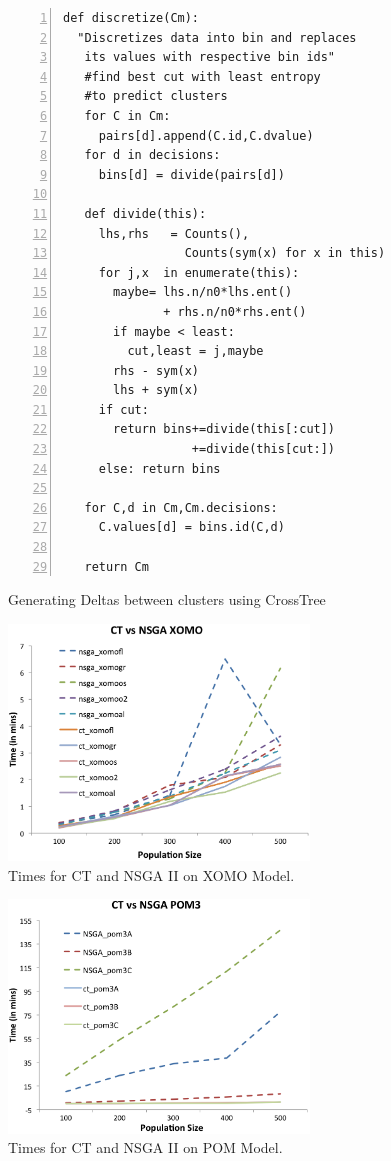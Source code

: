 \documentclass[11pt,twocolumn]{article}
\begin{document}
\begin{figure}[!b]
\begin{center}
\begin{lstlisting}[mathescape,frame=l,numbers=left]
def discretize(Cm):
  "Discretizes data into bin and replaces 
   its values with respective bin ids"
   #find best cut with least entropy 
   #to predict clusters
   for C in Cm:
     pairs[d].append(C.id,C.dvalue)
   for d in decisions:
     bins[d] = divide(pairs[d])

   def divide(this):
     lhs,rhs   = Counts(),
                 Counts(sym(x) for x in this)
     for j,x  in enumerate(this): 
       maybe= lhs.n/n0*lhs.ent()  
              + rhs.n/n0*rhs.ent()
       if maybe < least:
         cut,least = j,maybe
       rhs - sym(x)
       lhs + sym(x)
     if cut:
       return bins+=divide(this[:cut])
                  +=divide(this[cut:])
     else: return bins

   for C,d in Cm,Cm.decisions:
     C.values[d] = bins.id(C,d)

   return Cm
\end{lstlisting}
\end{center}
\caption{Generating Deltas between clusters using CrossTree}
\label{fig:crosstrees}   
\end{figure}


\begin{figure}
\begin{center}
\includegraphics[width=8cm]{figures/xomotimes.png}
\end{center}
\caption[CT vs. NSGA II XOMO]{ Times for CT and NSGA II on XOMO Model.}
\label{fig:xomotimes}
\end{figure}


\begin{figure}
\begin{center}
\includegraphics[width=8cm]{figures/pomtimes.png}
\end{center}
\caption[CT vs. NSGA II POM]{ Times for CT and NSGA II on POM Model.}
\label{fig:pomtimes}
\end{figure}
\end{document}
